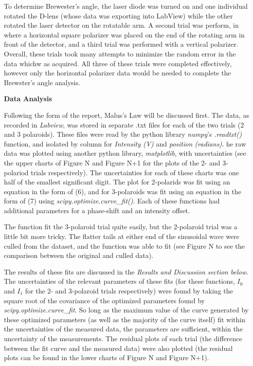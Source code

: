 \documentclass[11pt]{article}
\begin{document}
\begin{multicols}{2}
    To determine Brewester's angle, the laser diode was turned on and one individual rotated the D-lens (whose data was exporting into LabView) while the other rotated the laser detector on the rotatable arm. A second trial was perform, in where a horizontal square polarizer was placed on the end of the rotating arm in front of the detector, and a third trial was performed with a vertical polarizer. Overall, these trials took many attempts to minimize the random error in the data whichw as acquired. All three of these trials were completed effectively, however only the horizontal polarizer data would be needed to complete the Brewster's angle analysis.



    

    \vspace{10pt}

     \selectfont \textbf{Data Analysis}
    
     \selectfont 
    
    Following the form of the report, Malus's Law will be discussed first. The data, as recorded in \textit{Labview}, was stored in separate .txt files for each of the two trials (2 and 3 polaroids). 
    These files were read by the python library \textit{numpy}'s \textit{.readtxt()} function, and isolated by column for \textit{Intensity (V)} and \textit{position (radians)}.
    he raw data was plotted using another python library, \textit{matplotlib}, with uncertainties (see the upper charts of Figure N and Figure N+1 for the plots of the 2- and 3-polariod trials respectively).
    The uncertainties for each of these charts was one half of the smallest significant digit.
    The plot for 2-polarids was fit using an equation in the form of (6), and for 3-polaroids was fit using an equation in the form of (7) using \textit{scipy.optimize.curve\_fit()}. 
    Each of these functions had additional parameters for a phase-shift and an intensity offset.  

    The function fit the 3-polaroid trial quite easily, but the 2-polaroid trial was a little bit more tricky. The flatter tails at either end of the sinusoidal wave were culled from the dataset, and the function was able to fit (see Figure N to see the comparison between the original and culled data). 

    The results of these fits are discussed in the \textit{Results and Discussion section below}. The uncertainties of the relevant parameters of these fits (for these functions, $I_0$ and $I_1$ for the 2- and 3-polaroid trials respectively) were found by taking the square root of the covariance of the optimized parameters found by \textit{scipy.optimize.curve\_fit}. So long as the maximum value of the curve generated by these optimized parameters (as well as the majority of the curve itself) fit within the uncertainties of the measured data, the parameters are sufficient, within the uncertainty of the measurements. The residual plots of each trial (the difference between the fit curve and the measured data) were also plotted (the residual plots can be found in the lower charts of Figure N and Figure N+1).
    

\end{multicols}
\end{document}
